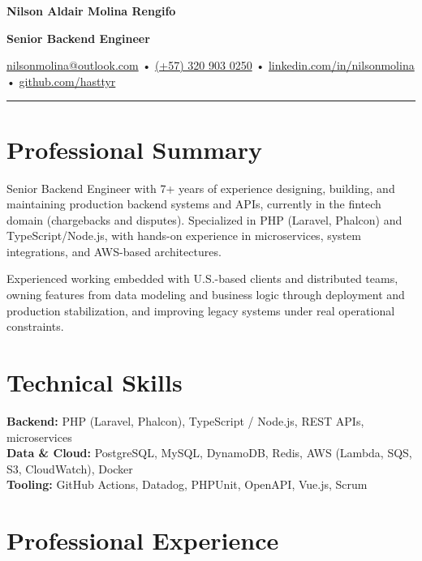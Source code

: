 \documentclass[9pt,letterpaper]{extarticle}
\begin{document}
	
	\begin{center}
		{\LARGE \textbf{Nilson Aldair Molina Rengifo}}
		
		\textbf{Senior Backend Engineer}

		\href{mailto:nilsonmolina@outlook.com}{nilsonmolina@outlook.com} •
		\href{https://wa.me/573209030250}{(+57) 320 903 0250} •
		\href{https://linkedin.com/in/nilsonmolina}{linkedin.com/in/nilsonmolina} •
		\href{https://github.com/hasttyr}{github.com/hasttyr}
	\end{center}

	\hrule

	\section*{Professional Summary}
		Senior Backend Engineer with 7+ years of experience designing, building, and maintaining production backend systems and APIs, currently in the fintech domain (chargebacks and disputes). Specialized in PHP (Laravel, Phalcon) and TypeScript/Node.js, with hands-on experience in microservices, system integrations, and AWS-based architectures.

		Experienced working embedded with U.S.-based clients and distributed teams, owning features from data modeling and business logic through deployment and production stabilization, and improving legacy systems under real operational constraints.

	\section*{Technical Skills}
		\textbf{Backend:} PHP (Laravel, Phalcon), TypeScript / Node.js, REST APIs, microservices \\
		\textbf{Data \& Cloud:} PostgreSQL, MySQL, DynamoDB, Redis, AWS (Lambda, SQS, S3, CloudWatch), Docker \\
		\textbf{Tooling:} GitHub Actions, Datadog, PHPUnit, OpenAPI, Vue.js, Scrum

	\section*{Professional Experience}
	
\end{document}
